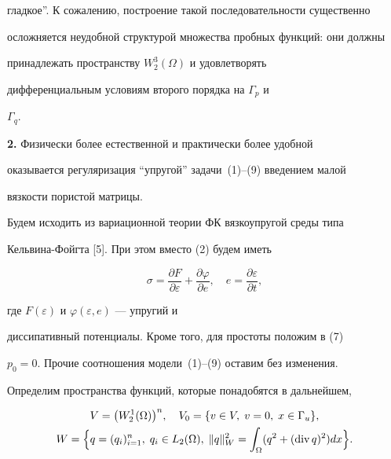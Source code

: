 гладкое''. К сожалению, построение такой последовательности существенно


осложняется неудобной структурой множества пробных функций: они должны


принадлежать пространству $W^{3}_{2}(\Omega)$ и удовлетворять


дифференциальным условиям второго порядка на $\Gamma_{p}$ и


$\Gamma_{q}$.


\medskip





{\bf 2.} Физически более естественной и практически более удобной


оказывается регуляризация ``упругой'' задачи~(1)--(9) введением малой


вязкости пористой матрицы.





Будем исходить из вариационной теории ФК вязкоупругой среды типа


Кельвина-Фойгта [5]. При этом вместо (2) будем иметь


\begin{equation}


\sigma = \frac{\partial F}{\partial \varepsilon}+


\frac{\partial \varphi}{\partial e}, \quad


e= \frac{\partial \varepsilon}{\partial t}, \tag{2$'$}


\end{equation}




где $F(\varepsilon)$ и $\varphi(\varepsilon,e)$ --- упругий и


диссипативный потенциалы. Кроме того, для простоты положим в (7)


$p_{0}=0$. Прочие соотношения модели~(1)--(9) оставим без изменения.





Определим пространства функций, которые понадобятся в дальнейшем,


\begin{gather*}


V= \bigl ( W^{1}_{2} (\Omega) \bigr )^{n}, \quad


V_{0}= \{ v \in V, \; v=0, \; x \in \Gamma_{u} \}, \\


W= \Bigl \{ q=(q_{i})^{n}_{i=1}, \; q_{i} \in L_{2}(\Omega),\;


\|q \|^{2}_{W}=\int_{\Omega}(q^{2} + ( \Div q)^{2} ) dx \Bigr \}.


\end{gather*}


